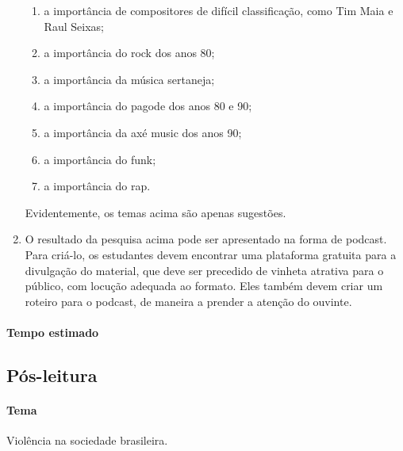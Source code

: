 \documentclass[11pt]{extarticle}
\begin{document}
\begin{enumerate}
\begin{enumerate}
\item a importância de compositores de difícil classificação, como Tim Maia
e Raul Seixas;

\item a importância do rock dos anos 80;

\item a importância da música sertaneja;

\item a importância do pagode dos anos 80 e 90;

\item a importância da axé music dos anos 90;

\item a importância do funk;

\item a importância do rap.
\end{enumerate}

Evidentemente, os temas acima são apenas sugestões.

\item O resultado da pesquisa acima pode ser apresentado na forma de
podcast. Para criá-lo, os estudantes devem encontrar uma plataforma
gratuita para a divulgação do material, que deve ser precedido de
vinheta atrativa para o público, com locução adequada ao formato. Eles
também devem criar um roteiro para o podcast, de maneira a prender a
atenção do ouvinte.
\end{enumerate}

\paragraph{Tempo estimado}

\subsection{Pós-leitura}

%
%

\paragraph{Tema} Violência na sociedade brasileira.
\end{document}
